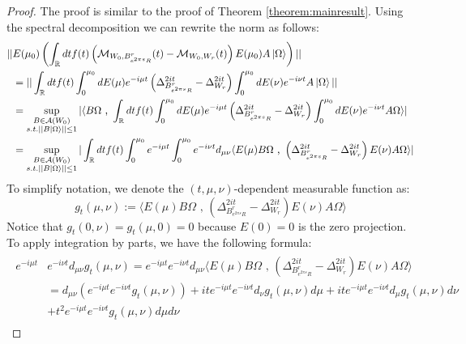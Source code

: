 \documentclass[a4paper,11pt]{article}
\theoremstyle{definition}
\newcommand{\lb}{\left(}
\newcommand{\rb}{\right)}
\begin{document}
\begin{proof}
    The proof is similar to the proof of Theorem \ref{theorem:mainresult}. Using the spectral decomposition we can rewrite the norm as follows:
    \begin{align}
        \begin{split}
            ||&E(\mu_0)\lb\int_\mathbb{R} dt f(t)\lb\mathcal{M}_{W_0, B^r_{e^{2\pi s}R}}(t) - \mathcal{M}_{W_0, W_r}(t)\rb E(\mu_0)A\ket{\Omega}\rb||
            \\&
            =||\int_\mathbb{R} dt f(t)\int_0^{\mu_0} dE(\mu) e^{-i\mu t}\lb\Delta^{2it}_{B^r_{e^{2\pi s}R}} - \Delta_{W_r}^{2it}\rb \int_0^{\mu_0}dE(\nu) e^{-i\nu t} A\ket{\Omega}||
            \\&
            =\sup_{\substack{B\in\mathcal{A}(W_0)\\s.t.||B\ket{\Omega}||\leq 1}}|\langle B\Omega\text{ , }\int_\mathbb{R} dt f(t)\int_0^{\mu_0} dE(\mu)e^{-i\mu t}\lb\Delta_{B^r_{e^{2\pi s}R}}^{2it} - \Delta_{W_r}^{2it}\rb\int_0^{\mu_0}dE(\nu)e^{-i\nu t}A\Omega\rangle|
            \\&
            =\sup_{\substack{B\in\mathcal{A}(W_0)\\s.t.||B\ket{\Omega}||\leq 1}}|\int_\mathbb{R} dt f(t)\int_0^{\mu_0}e^{-i\mu t}\int_0^{\mu_0}e^{-i\nu t}d_{\mu\nu}\langle E(\mu)B\Omega\text{ , }\lb\Delta^{2it}_{B^r_{e^{2\pi s}R}} - \Delta^{2it}_{W_r}\rb E(\nu)A\Omega\rangle|
        \end{split}
    \end{align}
    To simplify notation, we denote the $(t,\mu,\nu)$-dependent measurable function as:
    \begin{equation}
        g_t(\mu,\nu):=\langle E(\mu)B\Omega\text{ , }\lb\Delta^{2it}_{B^r_{e^{2\pi s}R}} - \Delta^{2it}_{W_r}\rb E(\nu)A\Omega \rangle
    \end{equation}
    Notice that $g_t(0,\nu) = g_t(\mu,0) = 0$ because $E(0) = 0$ is the zero projection. To apply integration by parts, we have the following formula:
    \begin{align}
        \begin{split}
            e^{-i\mu t}&e^{-i\nu t}d_{\mu\nu}g_t(\mu,\nu) = e^{-i\mu t}e^{-i\nu t}d_{\mu\nu}\langle E(\mu)B\Omega\text{ , }\lb\Delta^{2it}_{B^r_{e^{2\pi s}R}} - \Delta^{2it}_{W_r}\rb E(\nu)A\Omega\rangle
            \\&
            = d_{\mu\nu}\lb e^{-i\mu t}e^{-i\nu t}g_t(\mu,\nu) \rb + ite^{-i\mu t}e^{-i\nu t} d_\nu g_t(\mu,\nu) d\mu+ ite^{-i\mu t}e^{-i\nu t} d_\mu g_t(\mu,\nu)d\nu \\&+ t^2 e^{-i\mu t}e^{-i\nu t} g_t(\mu,\nu)d\mu d\nu

\end{split}
\end{align}
\end{proof}
\end{document}
